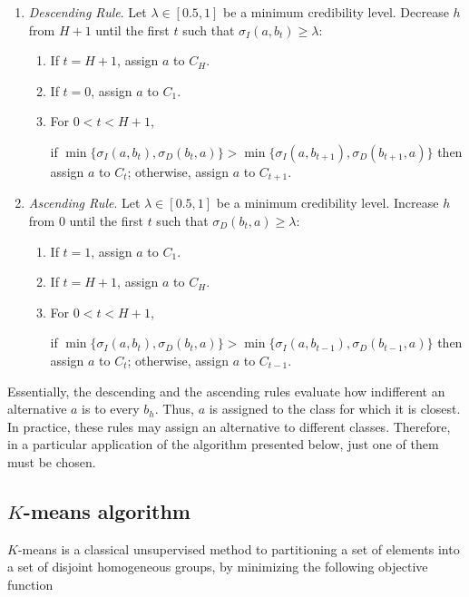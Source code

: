 \documentclass[]{elsarticle}
\theoremstyle{definition}
\begin{document}
\begin{enumerate}
\item
\emph{Descending Rule}. Let $\lambda \in [0.5,1]$ be a minimum credibility level. Decrease $h$ from $H+1$ until the first $t$ such that $\sigma_I(a,b_t)\geq \lambda$:

\begin{enumerate}
\item
If $t=H+1$, assign $a$ to $C_H$.
\item
If $t=0$, assign $a$ to $C_1$.
\item
For $0<t<H+1$, 

if $\min\{\sigma_I(a,b_t),\sigma_D(b_t,a)\} > \min\{\sigma_I(a,b_{t+1}),\sigma_D(b_{t+1},a)\}$ then assign $a$ to $C_t$; otherwise, assign $a$ to $C_{t+1}$.
\end{enumerate} 

\item
\emph{Ascending Rule}. Let $\lambda \in [0.5,1]$ be a minimum credibility level. Increase $h$ from $0$ until the first $t$ such that $\sigma_D(b_t,a)\geq \lambda$:

\begin{enumerate}
\item
If $t=1$, assign $a$ to $C_1$.
\item
If $t=H+1$, assign $a$ to $C_H$.
\item
For $0<t<H+1$, 

if $\min\{\sigma_I(a,b_t),\sigma_D(b_t,a)\} > \min\{\sigma_I(a,b_{t-1}),\sigma_D(b_{t-1},a)\}$ then assign $a$ to $C_t$; otherwise, assign $a$ to $C_{t-1}$.
\end{enumerate} 
\end{enumerate}


Essentially, the descending and the ascending rules evaluate how indifferent an alternative $a$ is to every $b_h$.  Thus, $a$ is assigned to the class for which it is closest.  In practice, these rules may assign an alternative to different classes. Therefore, in a particular application of the algorithm presented below, just one of them must be chosen.


\subsection{$K$-means algorithm}

$K$-means is a classical unsupervised method to partitioning a set of elements into a set of disjoint homogeneous groups, by minimizing the following objective function 
\end{document}
